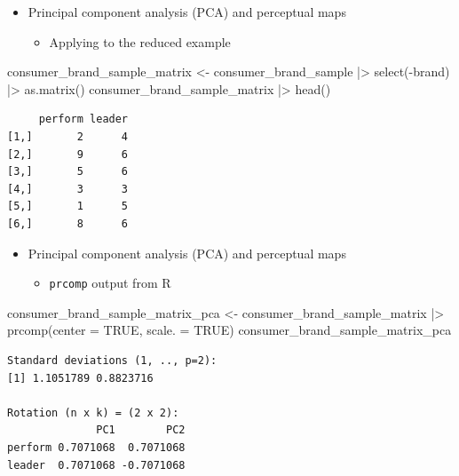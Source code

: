 \documentclass[
  ignorenonframetext,
]{beamer}
\newenvironment{Shaded}{\begin{snugshade}}{\end{snugshade}}
\newcommand{\AttributeTok}[1]{\textcolor[rgb]{0.40,0.45,0.13}{#1}}
\newcommand{\ConstantTok}[1]{\textcolor[rgb]{0.56,0.35,0.01}{#1}}
\newcommand{\FunctionTok}[1]{\textcolor[rgb]{0.28,0.35,0.67}{#1}}
\newcommand{\NormalTok}[1]{\textcolor[rgb]{0.00,0.23,0.31}{#1}}
\newcommand{\OtherTok}[1]{\textcolor[rgb]{0.00,0.23,0.31}{#1}}
\newcommand{\SpecialCharTok}[1]{\textcolor[rgb]{0.37,0.37,0.37}{#1}}
\providecommand{\tightlist}{%
  \setlength{\itemsep}{0pt}\setlength{\parskip}{0pt}}\usepackage{longtable,booktabs,array}
\begin{document}
\begin{frame}[fragile]{}
\label{section-28}
\begin{itemize}
\item
  Principal component analysis (PCA) and perceptual maps

  \begin{itemize}
  \tightlist
  \item
    Applying to the reduced example
  \end{itemize}
\end{itemize}

\tiny

\begin{Shaded}
\begin{Highlighting}[]
\NormalTok{consumer\_brand\_sample\_matrix }\OtherTok{\textless{}{-}}\NormalTok{ consumer\_brand\_sample }\SpecialCharTok{|\textgreater{}} 
  \FunctionTok{select}\NormalTok{(}\SpecialCharTok{{-}}\NormalTok{brand) }\SpecialCharTok{|\textgreater{}}
  \FunctionTok{as.matrix}\NormalTok{()}
\NormalTok{consumer\_brand\_sample\_matrix }\SpecialCharTok{|\textgreater{}} \FunctionTok{head}\NormalTok{()}
\end{Highlighting}
\end{Shaded}

\begin{verbatim}
     perform leader
[1,]       2      4
[2,]       9      6
[3,]       5      6
[4,]       3      3
[5,]       1      5
[6,]       8      6
\end{verbatim}
\end{frame}

\begin{frame}[fragile]{}
\label{section-29}
\begin{itemize}
\item
  Principal component analysis (PCA) and perceptual maps

  \begin{itemize}
  \tightlist
  \item
    \texttt{prcomp} output from R
  \end{itemize}
\end{itemize}

\tiny

\begin{Shaded}
\begin{Highlighting}[]
\NormalTok{consumer\_brand\_sample\_matrix\_pca }\OtherTok{\textless{}{-}}\NormalTok{ consumer\_brand\_sample\_matrix }\SpecialCharTok{|\textgreater{}} 
  \FunctionTok{prcomp}\NormalTok{(}\AttributeTok{center =} \ConstantTok{TRUE}\NormalTok{, }\AttributeTok{scale. =} \ConstantTok{TRUE}\NormalTok{)}
\NormalTok{consumer\_brand\_sample\_matrix\_pca}
\end{Highlighting}
\end{Shaded}

\begin{verbatim}
Standard deviations (1, .., p=2):
[1] 1.1051789 0.8823716

Rotation (n x k) = (2 x 2):
              PC1        PC2
perform 0.7071068  0.7071068
leader  0.7071068 -0.7071068
\end{verbatim}
\end{frame}
\end{document}
